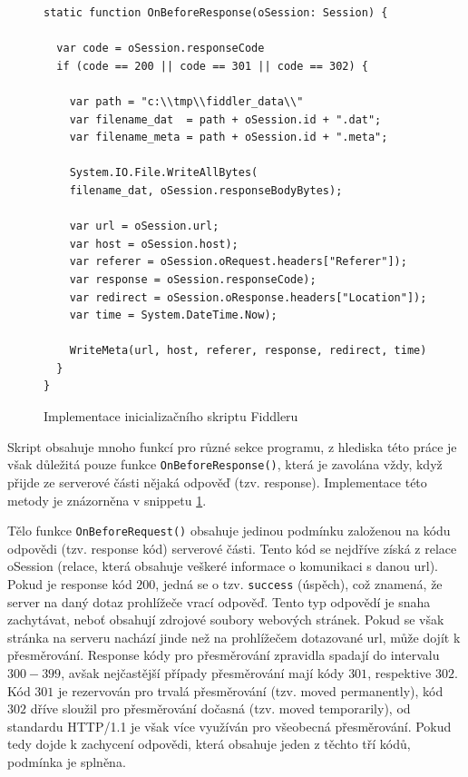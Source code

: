 \documentclass[thesis=M,czech,hidelinks]{FITthesis}[2013/05/06]
\begin{document}
\begin{figure}[h]               
	\begin{verbatim}
static function OnBeforeResponse(oSession: Session) {
	
  var code = oSession.responseCode
  if (code == 200 || code == 301 || code == 302) {
	
    var path = "c:\\tmp\\fiddler_data\\"
    var filename_dat  = path + oSession.id + ".dat";
    var filename_meta = path + oSession.id + ".meta";
	
    System.IO.File.WriteAllBytes(
    filename_dat, oSession.responseBodyBytes);
	
    var url = oSession.url;
    var host = oSession.host);
    var referer = oSession.oRequest.headers["Referer"]);
    var response = oSession.responseCode);
    var redirect = oSession.oResponse.headers["Location"]);
    var time = System.DateTime.Now);
	
    WriteMeta(url, host, referer, response, redirect, time)
  }
}
	\end{verbatim}      
	\caption{Implementace inicializačního skriptu Fiddleru}
	\label{snip:fiddler}
\end{figure}

Skript obsahuje mnoho funkcí pro různé sekce programu, z hlediska této práce je však důležitá pouze funkce \texttt{OnBeforeResponse()}, která je zavolána vždy, když přijde ze serverové části nějaká odpověď (tzv. response). Implementace této metody je znázorněna v snippetu \ref{snip:fiddler}.

Tělo funkce \texttt{OnBeforeRequest()} obsahuje jedinou podmínku založenou na kódu odpovědi (tzv. response kód) serverové části. Tento kód se nejdříve získá z relace oSession (relace, která obsahuje veškeré informace o komunikaci s danou url). Pokud je response kód $200$, jedná se o tzv. \texttt{success} (úspěch), což znamená, že server na daný dotaz prohlížeče vrací odpověď. Tento typ odpovědí je snaha zachytávat, neboť obsahují zdrojové soubory webových stránek. Pokud se však stránka na serveru nachází jinde než na prohlížečem dotazované url, může dojít k přesměrování. Response kódy pro přesměrování zpravidla spadají do intervalu $300-399$, avšak nejčastější případy přesměrování mají kódy $301$, respektive $302$. Kód $301$ je rezervován pro trvalá přesměrování (tzv. moved permanently), kód $302$ dříve sloužil pro přesměrování dočasná (tzv. moved temporarily), od standardu HTTP/1.1 je však více využíván pro všeobecná přesměrování\cite{response_codes}. Pokud tedy dojde k zachycení odpovědi, která obsahuje jeden z těchto tří kódů, podmínka je splněna.
\end{document}
